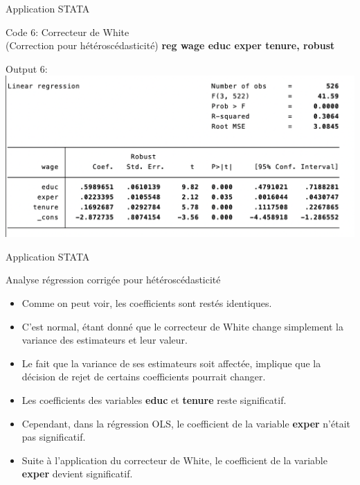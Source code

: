 \documentclass{beamer}
\begin{document}
\begin{frame}{Application STATA}
\begin{block}{Code 6: Correcteur de White \\ (Correction pour hétéroscédasticité)}
\textbf{reg wage educ exper tenure, robust}
\end{block}
\begin{block}{Output 6:}
\includegraphics[scale=.5]{correcteur.png}
\end{block}
\end{frame}


\begin{frame}{Application STATA}
\begin{block}{Analyse régression corrigée pour hétéroscédasticité}
\begin{itemize}
\item Comme on peut voir, les coefficients sont restés identiques.
\item C’est normal, étant donné que le correcteur de White change simplement la variance des estimateurs et leur valeur.
\item Le fait que la variance de ses estimateurs soit affectée, implique que la décision de rejet de certains coefficients pourrait changer.
\item Les coefficients des variables \textbf{educ} et \textbf{tenure} reste significatif.
\item Cependant, dans la régression OLS, le coefficient de la variable \textbf{exper} n’était pas significatif.
\item Suite à l’application du correcteur de White, le coefficient de la variable \textbf{exper} devient significatif.
\end{itemize}
\end{block}
\end{frame}
\end{document}
